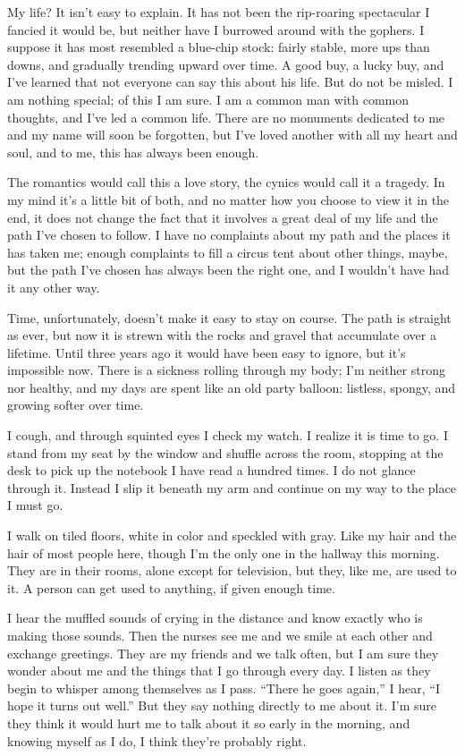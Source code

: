 \documentclass[10pt, twoside, openright]{book}
\begin{document}
My life? It isn't easy to explain. It has not been the rip-roaring
spectacular I fancied it would be, but neither have I burrowed around
with the gophers. I suppose it has most resembled a blue-chip stock:
fairly stable, more ups than downs, and gradually trending upward over
time. A good buy, a lucky buy, and I've learned that not everyone can
say this about his life. But do not be misled. I am nothing special; of
this I am sure. I am a common man with common thoughts, and I've led a
common life. There are no monuments dedicated to me and my name will
soon be forgotten, but I've loved another with all my heart and soul,
and to me, this has always been enough.

The romantics would call this a love story, the cynics would call it a
tragedy. In my mind it's a little bit of both, and no matter how you
choose to view it in the end, it does not change the fact that it
involves a great deal of my life and the path I've chosen to follow. I
have no complaints about my path and the places it has taken me; enough
complaints to fill a circus tent about other things, maybe, but the path
I've chosen has always been the right one, and I wouldn't have had it
any other way.

Time, unfortunately, doesn't make it easy to stay on course. The path is
straight as ever, but now it is strewn with the rocks and gravel that
accumulate over a lifetime. Until three years ago it would have been
easy to ignore, but it's impossible now. There is a sickness rolling
through my body; I'm neither strong nor healthy, and my days are spent
like an old party balloon: listless, spongy, and growing softer over
time.

I cough, and through squinted eyes I check my watch. I realize it is
time to go. I stand from my seat by the window and shuffle across the
room, stopping at the desk to pick up the notebook I have read a hundred
times. I do not glance through it. Instead I slip it beneath my arm and
continue on my way to the place I must go.

I walk on tiled floors, white in color and speckled with gray. Like my
hair and the hair of most people here, though I'm the only one in the
hallway this morning. They are in their rooms, alone except for
television, but they, like me, are used to it. A person can get used to
anything, if given enough time.

I hear the muffled sounds of crying in the distance and know exactly who
is making those sounds. Then the nurses see me and we smile at each
other and exchange greetings. They are my friends and we talk often, but
I am sure they wonder about me and the things that I go through every
day. I listen as they begin to whisper among themselves as I pass.
``There he goes again,'' I hear, ``I hope it turns out well.'' But they
say nothing directly to me about it. I'm sure they think it would hurt
me to talk about it so early in the morning, and knowing myself as I do,
I think they're probably right.
\end{document}
